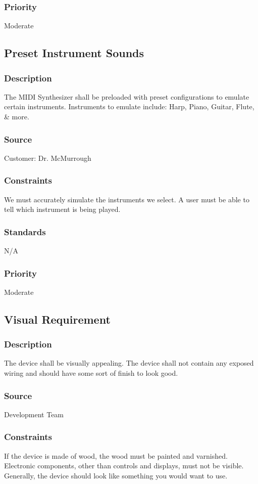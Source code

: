 \subsubsection{Priority}
Moderate

\subsection{Preset Instrument Sounds}
\subsubsection{Description}
The MIDI Synthesizer shall be preloaded with preset configurations to emulate certain instruments. Instruments to emulate include: Harp, Piano, Guitar, Flute, & more.
\subsubsection{Source}
Customer: Dr. McMurrough
\subsubsection{Constraints}
We must accurately simulate the instruments we select. A user must be able to tell which instrument is being played.
\subsubsection{Standards}
N/A
\subsubsection{Priority}
Moderate

\subsection{Visual Requirement}
\subsubsection{Description}
The device shall be visually appealing. The device shall not contain any exposed wiring and should have some sort of finish to look good.
\subsubsection{Source}
Development Team
\subsubsection{Constraints}
If the device is made of wood, the wood must be painted and varnished. Electronic components, other than controls and displays, must not be visible. Generally, the device should look like something you would want to use.
